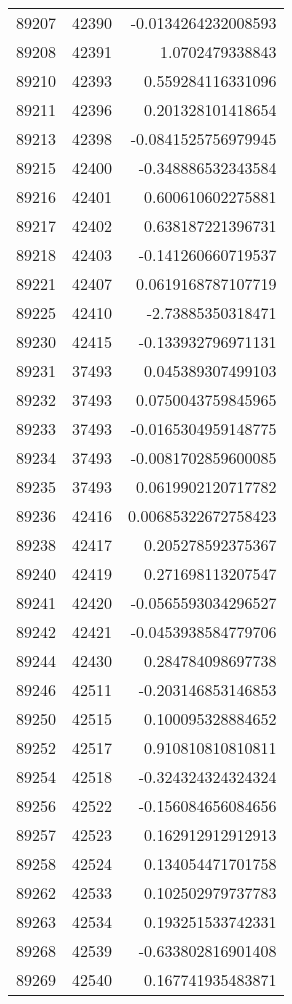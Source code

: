 \begin{tabular}{r | r | r}
89207 & 42390 & -0.0134264232008593 \\
89208 & 42391 & 1.0702479338843 \\
89210 & 42393 & 0.559284116331096 \\
89211 & 42396 & 0.201328101418654 \\
89213 & 42398 & -0.0841525756979945 \\
89215 & 42400 & -0.348886532343584 \\
89216 & 42401 & 0.600610602275881 \\
89217 & 42402 & 0.638187221396731 \\
89218 & 42403 & -0.141260660719537 \\
89221 & 42407 & 0.0619168787107719 \\
89225 & 42410 & -2.73885350318471 \\
89230 & 42415 & -0.133932796971131 \\
89231 & 37493 & 0.045389307499103 \\
89232 & 37493 & 0.0750043759845965 \\
89233 & 37493 & -0.0165304959148775 \\
89234 & 37493 & -0.0081702859600085 \\
89235 & 37493 & 0.0619902120717782 \\
89236 & 42416 & 0.00685322672758423 \\
89238 & 42417 & 0.205278592375367 \\
89240 & 42419 & 0.271698113207547 \\
89241 & 42420 & -0.0565593034296527 \\
89242 & 42421 & -0.0453938584779706 \\
89244 & 42430 & 0.284784098697738 \\
89246 & 42511 & -0.203146853146853 \\
89250 & 42515 & 0.100095328884652 \\
89252 & 42517 & 0.910810810810811 \\
89254 & 42518 & -0.324324324324324 \\
89256 & 42522 & -0.156084656084656 \\
89257 & 42523 & 0.162912912912913 \\
89258 & 42524 & 0.134054471701758 \\
89262 & 42533 & 0.102502979737783 \\
89263 & 42534 & 0.193251533742331 \\
89268 & 42539 & -0.633802816901408 \\
89269 & 42540 & 0.167741935483871 \\

\end{tabular}
